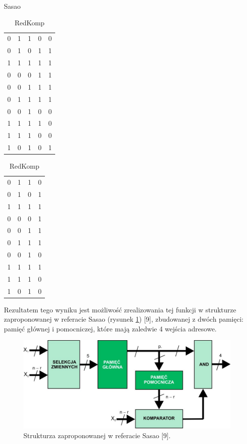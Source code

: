 \begin{table}[t]
\begin{subtable}{.64\linewidth}
\end{subtable}
\begin{subtable}{.12\linewidth}
\caption{Sasao}
\label{sasao-b}
\begin{tabular}{|r@{}c@{}c@{}c@{}l|}
\hline
0 & 1 & 1 & 0 & 0 \\
0 & 1 & 0 & 1 & 1 \\
1 & 1 & 1 & 1 & 1 \\
0 & 0 & 0 & 1 & 1 \\
0 & 0 & 1 & 1 & 1 \\
0 & 1 & 1 & 1 & 1 \\
0 & 0 & 1 & 0 & 0 \\
1 & 1 & 1 & 1 & 0 \\
1 & 1 & 1 & 0 & 0 \\
1 & 0 & 1 & 0 & 1 \\
\hline
\end{tabular}
\end{subtable}
\begin{subtable}{.16\linewidth}
\caption{RedKomp}
\label{sasao-c}
\begin{tabular}{|r@{}c@{}c@{}l|}
\hline
0 & 1 & 1 & 0 \\
0 & 1 & 0 & 1 \\
1 & 1 & 1 & 1 \\
0 & 0 & 0 & 1 \\
0 & 0 & 1 & 1 \\
0 & 1 & 1 & 1 \\
0 & 0 & 1 & 0 \\
1 & 1 & 1 & 1 \\
1 & 1 & 1 & 0 \\
1 & 0 & 1 & 0 \\
\hline
\end{tabular}
\end{subtable}
\end{table}

Rezultatem tego wyniku jest możliwość zrealizowania tej funkcji w strukturze zaproponowanej w referacie Sasao (rysunek \ref{fig:sasao-structure}) [9],
zbudowanej z dwóch pamięci: pamięć głównej i pomocniczej,
które mają zaledwie 4 wejścia adresowe.

\begin{figure}[H]
\centering
\includegraphics[width = 13cm]{chapter04/sasao-structure.jpg}
\caption{Strukturza zaproponowanej w referacie Sasao [9].}
\label{fig:sasao-structure}
\end{figure}

